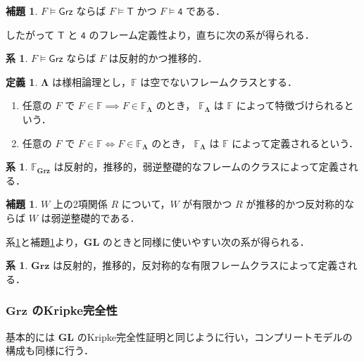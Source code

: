 \documentclass{jsarticle}
\newcommand*{\Ax}[1]{\mathsf{#1}}
\newcommand*{\AxT}{\Ax{T}}
\newcommand*{\AxFour}{\Ax{4}}
\newcommand*{\AxGrz}{\Ax{Grz}}
\newcommand*{\Logic}[1]{\mathbf{#1}}
\newcommand*{\LogicGL}{\Logic{GL}}
\newcommand*{\LogicGrz}{\Logic{Grz}}
\newcommand*{\FrameClass}{\mathbb{F}}
\newcommand*{\FrameClassOf}[1]{\FrameClass_{#1}}
\theoremstyle{definition}
\newtheorem{lemma}[theorem]{補題}
\newtheorem{definition}[theorem]{定義}
\newtheorem{corollary}[theorem]{系}
\begin{document}
\begin{lemma}
	$F \vDash \AxGrz$ ならば $F \vDash \AxT$ かつ $F \vDash \AxFour$ である．
\end{lemma}

したがって $\AxT$ と $\AxFour$ のフレーム定義性より，直ちに次の系が得られる．

\begin{corollary}
	$F \vDash \AxGrz$ ならば $F$ は反射的かつ推移的．
\end{corollary}

\begin{definition}
	$\Logic{\Lambda}$ は様相論理とし，$\FrameClass$ は空でないフレームクラスとする．
	\begin{enumerate}
		\item
		      任意の $F$ で $F \in \FrameClass \implies F \in \FrameClassOf{\Logic{\Lambda}} $ のとき，
		      $\FrameClassOf{\Logic{\Lambda}}$ は $\FrameClass$ によって特徴づけられるという．
		\item
		      任意の $F$ で $F \in \FrameClass \iff F \in \FrameClassOf{\Logic{\Lambda}} $ のとき，
		      $\FrameClassOf{\Logic{\Lambda}}$ は $\FrameClass$ によって定義されるという．
	\end{enumerate}
\end{definition}

\begin{corollary} \label{cor:LogicGrz_definedBy}
	$\FrameClassOf{\LogicGrz}$ は反射的，推移的，弱逆整礎的なフレームのクラスによって定義される．
\end{corollary}

\begin{lemma}\label{lem:wcwf_of_finite_trans_antisymm}
	$W$ 上の2項関係 $R$ について，$W$ が有限かつ $R$ が推移的かつ反対称的ならば $W$ は弱逆整礎的である．
\end{lemma}

系\ref{cor:LogicGrz_definedBy}と補題\ref{lem:wcwf_of_finite_trans_antisymm}より，$\LogicGL$ のときと同様に使いやすい次の系が得られる．
\begin{corollary}
	$\LogicGrz$ は反射的，推移的，反対称的な有限フレームクラスによって定義される．
\end{corollary}

\subsubsection{$\LogicGrz$ のKripke完全性}

基本的には $\LogicGL$ のKripke完全性証明と同じように行い，コンプリートモデルの構成も同様に行う．
\end{document}
